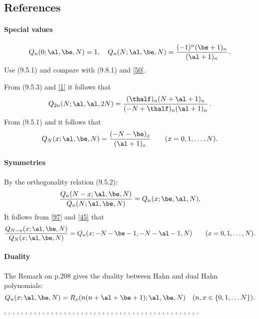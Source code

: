 \documentclass[envcountchap,graybox]{svmono}
\newcounter{rom}
\begin{document}
\subsection*{References}
\label{sec9.5}
%
\paragraph{Special values}
\begin{equation}
Q_n(0;\al,\be,N)=1,\quad
Q_n(N;\al,\be,N)=\frac{(-1)^n(\be+1)_n}{(\al+1)_n}\,.
\label{95}
\end{equation}
Use (9.5.1) and compare with (9.8.1) and \eqref{50}.

From (9.5.3) and \eqref{1} it follows that
\begin{equation}
Q_{2n}(N;\al,\al,2N)=\frac{(\thalf)_n(N+\al+1)_n}{(-N+\thalf)_n(\al+1)_n}\,.
\label{30}
\end{equation}
From (9.5.1) and  it follows that
\begin{equation}
Q_N(x;\al,\be,N)=\frac{(-N-\be)_x}{(\al+1)_x}\qquad(x=0,1,\ldots,N).
\label{44}
\end{equation}
%
\paragraph{Symmetries}
By the orthogonality relation (9.5.2):
\begin{equation}
\frac{Q_n(N-x;\al,\be,N)}{Q_n(N;\al,\be,N)}=Q_n(x;\be,\al,N),
\label{96}
\end{equation}
It follows from \eqref{97} and \eqref{45} that
\begin{equation}
\frac{Q_{N-n}(x;\al,\be,N)}{Q_N(x;\al,\be,N)}
=Q_n(x;-N-\be-1,-N-\al-1,N)
\qquad(x=0,1,\ldots,N).
\label{100}
\end{equation}
%
\paragraph{Duality}
The Remark on p.208 gives the duality between Hahn and dual Hahn polynomials:
%
\begin{equation}
Q_n(x;\al,\be,N)=R_x(n(n+\al+\be+1);\al,\be,N)\quad(n,x\in\{0,1,\ldots N\}).
\label{45}
\end{equation}
%
\cite{AlSalam90}, \cite{AndrewsAskey85}, \cite{Area+II}, \cite{Askey75},
\cite{Askey89I}, \cite{Askey2005}, \cite{AskeyGasper77}, \cite{AskeyWilson85},
\cite{AtakRahmanSuslov}, \cite{AtakSuslov88}, \cite{Chihara78},
\cite{Ciesielski}, \cite{Cooper+}, \cite{Dette95}, \cite{Dunkl76},
\cite{Dunkl78I}, \cite{Gasper73I}, \cite{Gasper74}, \cite{HoareRahman},
\cite{Ismail77}, \cite{Ismail2005II}, \cite{Karlin61}, \cite{Koorn81}, \cite{Koorn88},
\cite{LabelleYehI}, \cite{LabelleYehII}, \cite{Laine}, \cite{Lesky62},
\cite{Lesky88}, \cite{Lesky89}, \cite{Lesky94I}, \cite{Lesky95II},
\cite{LewanowiczII}, \cite{Neuman}, \cite{Nikiforov+}, \cite{NikiforovUvarov},
\cite{Rahman76III}, \cite{Rahman78I}, \cite{Rahman78II}, \cite{Rahman81III},
\cite{Sablonniere}, \cite{Stanton84}, \cite{Stanton90}, \cite{Wilson80}, \cite{Wilson70II},
\cite{Zarzo+}.
\end{document}
